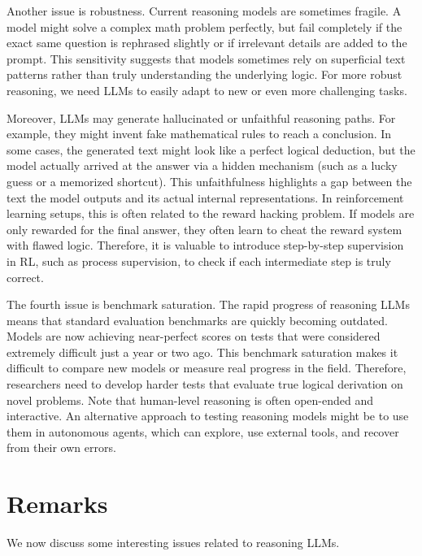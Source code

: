 Another issue is robustness. Current reasoning models are sometimes fragile. A model might solve a complex math problem perfectly, but fail completely if the exact same question is rephrased slightly or if irrelevant details are added to the prompt. This sensitivity suggests that models sometimes rely on superficial text patterns rather than truly understanding the underlying logic. For more robust reasoning, we need LLMs to easily adapt to new or even more challenging tasks.

Moreover, LLMs may generate hallucinated or unfaithful reasoning paths. For example, they might invent fake mathematical rules to reach a conclusion. In some cases, the generated text might look like a perfect logical deduction, but the model actually arrived at the answer via a hidden mechanism (such as a lucky guess or a memorized shortcut). This unfaithfulness highlights a gap between the text the model outputs and its actual internal representations. In reinforcement learning setups, this is often related to the reward hacking problem. If models are only rewarded for the final answer, they often learn to cheat the reward system with flawed logic. Therefore, it is valuable to introduce step-by-step supervision in RL, such as process supervision, to check if each intermediate step is truly correct.

The fourth issue is benchmark saturation. The rapid progress of reasoning LLMs means that standard evaluation benchmarks are quickly becoming outdated. Models are now achieving near-perfect scores on tests that were considered extremely difficult just a year or two ago. This benchmark saturation makes it difficult to compare new models or measure real progress in the field. Therefore, researchers need to develop harder tests that evaluate true logical derivation on novel problems. Note that human-level reasoning is often open-ended and interactive. An alternative approach to testing reasoning models might be to use them in autonomous agents, which can explore, use external tools, and recover from their own errors.


\section{Remarks}

We now discuss some interesting issues related to reasoning LLMs.

